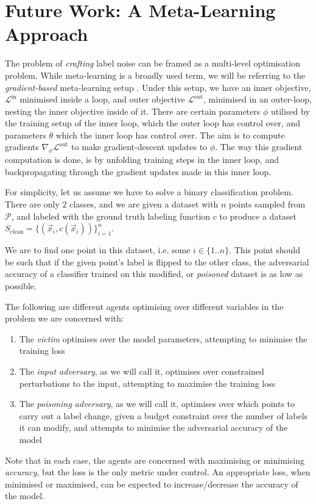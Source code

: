 \documentclass{ociamthesis}
\begin{document}
\chapter{Future Work: A Meta-Learning Approach}
The problem of \emph{crafting} label noise can be framed as a multi-level
optimisation problem. While meta-learning is a broadly used term, we will be
referring to the \emph{gradient-based} meta-learning setup
\citep{maml,first-order-meta,forward-reverse-hyperparameter}. Under this setup,
we have an inner objective, $\mathcal{L}^\text{in}$ minimised inside a loop, and
outer objective $\mathcal{L}^\text{out}$, minimised in an outer-loop, nesting
the inner objective inside of it. There are certain parameters $\phi$ utilised
by the training setup of the inner loop, which the outer loop has control over,
and parameters $\theta$ which the inner loop has control over. The aim is to
compute gradients $\nabla_\phi \mathcal{L}^\text{out}$ to make gradient-descent
updates to $\phi$. The way this gradient computation is done, is by unfolding
training steps in the inner loop, and backpropagating through the gradient
updates made in this inner loop.

For simplicity, let us assume we have to solve a binary classification problem.
There are only $2$ classes, and we are given a dataset with $n$ points sampled
from $\mathcal{P}$, and labeled with the ground truth labeling function $c$ to
produce a dataset $S_{\text{clean}}=\{(\vec{x}_i, c(\vec{x}_i))\}_{i=1}^n$. 

We are to find one point in this dataset, i.e. some $i \in \{1..n\}$. This point
should be such that if the given point's label is flipped to the other class,
the adversarial accuracy of a classifier trained on this modified, or
\emph{poisoned} dataset is as low as possible.

The following are different agents optimising over different variables in the
problem we are concerned with:
\begin{enumerate}
    \item The \emph{victim} optimises over the model parameters, attempting to
    minimise the training loss
    \item The \emph{input adversary}, as we will call it, optimises over
    constrained perturbations to the input, attempting to maximise the training
    loss
    \item The \emph{poisoning adversary}, as we will call it, optimises over
    which points to carry out a label change, given a budget constraint over the
    number of labels it can modify, and attempts to minimise the adversarial
    accuracy of the model
\end{enumerate}
Note that in each case, the agents are concerned with maximising or minimising
\emph{accuracy}, but the loss is the only metric under control. An appropriate
loss, when minimised or maximised, can be expected to increase/decrease the
accuracy of the model.
\end{document}
